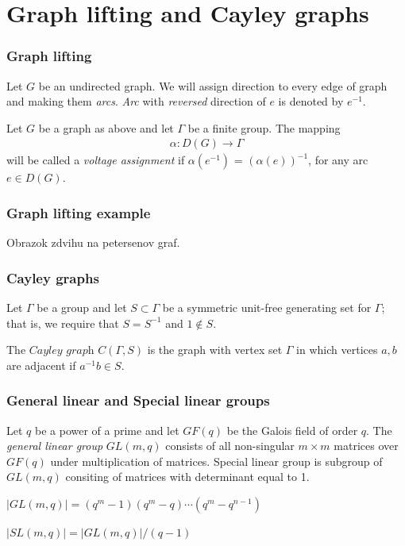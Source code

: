 \documentclass{beamer}
\begin{document}
\section{Graph lifting and Cayley graphs} 
\begin{frame}
	\frametitle{Graph lifting}
	Let $G$ be an undirected graph. We will assign direction to every edge of graph and making them {\em arcs}. {\em Arc} with {\em reversed} direction of $e$ is denoted by $e^{-1}$. 
	\begin{definition}
		Let $G$ be a graph as above and let $\Gamma$ be a finite group. The mapping
		\begin{align*}
			\alpha: D(G) \rightarrow \Gamma
		\end{align*}
		will be called a {\em voltage assignment} if $\alpha(e^{-1})$ = $(\alpha(e))^{-1}$, for any arc $e \in D(G)$.
	\end{definition}
\end{frame}
\begin{frame}
	\frametitle{Graph lifting example}
	Obrazok zdvihu na petersenov graf.
\end{frame}
\begin{frame}
	\frametitle{Cayley graphs}
	Let $\Gamma$ be a group and let $S\subset \Gamma$ be a symmetric unit-free generating set for $\Gamma$; that is, we require that $S=S^{-1}$ and $1\notin S$. 
	\begin{definition}
		The $\textit{Cayley graph}$ $C(\Gamma,S)$ is the graph with vertex set $\Gamma$ in which vertices $a,b$ are adjacent if $a^{-1}b\in S$. 		
	\end{definition}
\end{frame}
\begin{frame}
	\frametitle{General linear and Special linear groups}
		\begin{definition} Let $q$ be a power of a prime and let $GF(q)$ be the Galois field of order $q$. The {\em general linear group} $GL(m,q)$ consists of all non-singular $m\times m$ matrices over $GF(q)$ under multiplication of matrices.
		Special linear group is subgroup of $GL(m,q)$ consiting of matrices with determinant equal to 1.
		\end{definition}
		\begin{theorem}[Order of $GL(m,q)$]
			$|GL(m,q)| = (q^m - 1)(q^m - q) \cdots (q^m - q^{n-1})$
		\end{theorem}
		\begin{theorem}[Order of $SL(m,q)$]
			$|SL(m,q)| = |GL(m,q)|/(q-1)$
		\end{theorem}
\end{frame}
\end{document}
